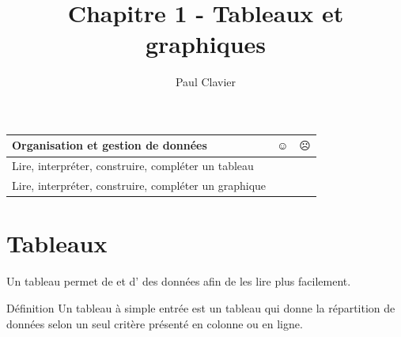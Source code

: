 \documentclass[12pt,a4paper]{article}
\author{Paul Clavier}
\title{Chapitre 1 - Tableaux et graphiques}
\begin{document}
\renewcommand\thesection{\Roman{section}}
\renewcommand\thesubsection{\arabic{subsection}}




\begin{center}
\end{center}

\begin{center}
\begin{tabular}{|l|c|c|}
\hline \rowcolor{lightgray}
Organisation et gestion de données \hspace{8cm} & $\smiley{}$ & $\frownie{}$\\ \hline
Lire, interpréter, construire, compléter un tableau & & \\ \hline
Lire, interpréter, construire, compléter un graphique & & \\ \hline
\end{tabular}
\end{center}

\section{Tableaux}
Un tableau permet de  et d' des données afin de les lire plus facilement.
\begin{definition}{Définition}
Un tableau à simple entrée est un tableau qui donne la répartition de données selon un seul critère présenté en colonne ou en ligne.
\end{definition}
\end{document}
